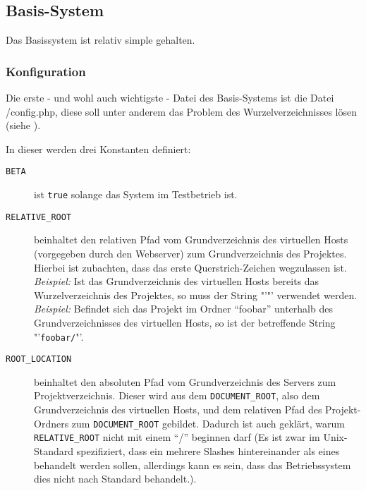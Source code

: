 \subsection{Basis-System}
Das Basissystem ist relativ simple gehalten.\\
\subsubsection{Konfiguration}
Die erste - und wohl auch wichtigste - Datei des Basis-Systems ist die Datei /config.php, diese soll unter anderem das Problem des Wurzelverzeichnisses lösen (siehe ).

In dieser werden drei Konstanten definiert:
\begin{description}
	\item[\texttt{BETA}] ist \texttt{true} solange das System im Testbetrieb ist.
	\item[\texttt{RELATIVE\_ROOT}] beinhaltet den relativen Pfad vom Grundverzeichnis des virtuellen Hosts (vorgegeben durch den Webserver) zum Grundverzeichnis des Projektes. Hierbei ist zubachten, dass das erste Querstrich-Zeichen wegzulassen ist.\\
	\textit{Beispiel:} Ist das Grundverzeichnis des virtuellen Hosts bereits das Wurzelverzeichnis des Projektes, so muss der String "'"' verwendet werden.\\
	\textit{Beispiel:} Befindet sich das Projekt im Ordner \enquote{foobar} unterhalb des Grundverzeichnisses des virtuellen Hosts, so ist der betreffende String "'\texttt{foobar/}"'.
	\item[\texttt{ROOT\_LOCATION}] beinhaltet den absoluten Pfad vom Grundverzeichnis des Servers zum Projektverzeichnis. Dieser wird aus dem \texttt{DOCUMENT\_ROOT}, also dem Grundverzeichnis des virtuellen Hosts, und dem relativen Pfad des Projekt-Ordners zum \texttt{DOCUMENT\_ROOT} gebildet. Dadurch ist auch geklärt, warum \texttt{RELATIVE\_ROOT} nicht mit einem \enquote{/} beginnen darf (Es ist zwar im Unix-Standard spezifiziert, dass ein mehrere Slashes hintereinander als eines behandelt werden sollen, allerdings kann es sein, dass das Betriebssystem dies nicht nach Standard behandelt.).
\end{description}

